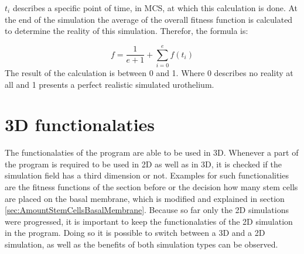 $t_{i}$ describes a specific point of time, in \ac{MCS}, at which this calculation is done. At the end of the simulation the average of the overall fitness function is calculated to determine the reality of this simulation. Therefor, the formula is:

\begin{equation} 
f = \dfrac{1}{e+1} + \sum_{i=0}^{e}{f(t_{i})}
\end{equation}
The result of the calculation is between 0 and 1. Where 0 describes no reality at all and 1 presents a perfect realistic simulated urothelium.


\section{3D functionalaties}\label{sec:3D}
The functionalaties of the program are able to be used in 3D. Whenever a part of the program is required to be used in 2D as well as in 3D, it is checked if the simulation field has a third dimension or not. Examples for such functionalities are the fitness functions of the section before or the decision how many stem cells are placed on the basal membrane, which is modified and explained in section \ref{sec:AmountStemCellsBasalMembrane}. \newline
Because so far only the 2D simulations were progressed, it is important to keep the functionalaties of the 2D simulation in the program. Doing so it is possible to switch between a 3D and a 2D simulation, as well as the benefits of both simulation types can be observed.
